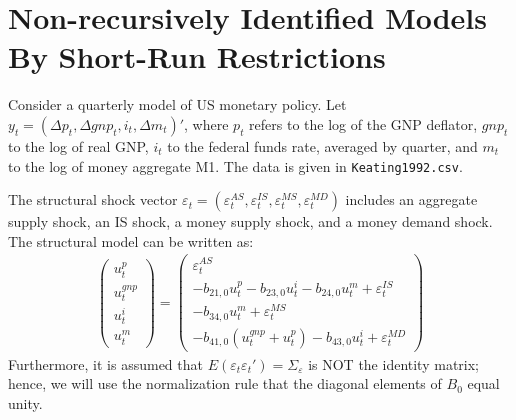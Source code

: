 \section[Non-recursively Identified Models By Short-Run Restrictions]{Non-recursively Identified Models By Short-Run Restrictions\label{ex:NonRecursivelyIdentifiedModelsShortRun}}
Consider a quarterly model of US monetary policy.
Let \(y_t=(\Delta p_t, \Delta gnp_t, i_t, \Delta m_t)'\),
  where \(p_t\) refers to the log of the GNP deflator,
  \(gnp_t\) to the log of real GNP,
  \(i_t\) to the federal funds rate, averaged by quarter,
  and \(m_t\) to the log of money aggregate M1.
The data is given in \texttt{Keating1992.csv}.

The structural shock vector \(\varepsilon_t = (\varepsilon_t^{AS},\varepsilon_t^{IS},\varepsilon_t^{MS},\varepsilon_t^{MD})\)
  includes an aggregate supply shock, an IS shock, a money supply shock, and a money demand shock.
The structural model can be written as:
\begin{align*}
\begin{pmatrix}
u_t^p\\u_t^{gnp}\\u_t^{i}\\u_t^m
\end{pmatrix} = 
\begin{pmatrix}
\varepsilon_{t}^{AS}\\
-b_{21,0}u_t^p - b_{23,0} u_t^i- b_{24,0}u_t^m +\varepsilon_{t}^{IS}\\
-b_{34,0}u_t^m + \varepsilon_{t}^{MS}\\
-b_{41,0}(u_t^{gnp}+u_t^p)-b_{43,0}u_t^i +\varepsilon_{t}^{MD}
\end{pmatrix}
\end{align*}
Furthermore, it is assumed that \(E(\varepsilon_t \varepsilon_t')=\Sigma_{\varepsilon}\) is NOT the identity matrix;
  hence, we will use the normalization rule that the diagonal elements of \(B_{0}\) equal unity.

